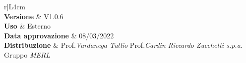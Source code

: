 \begin{center}
	\begin{tabular}{r|L{4cm}}
			 \\
			\hline
			\textbf{Versione}			& V1.0.6 \\
			\textbf{Uso}		& Esterno \\
			\textbf{Data approvazione} 			& 08/03/2022 \\
			\textbf{Distribuzione} 	&	Prof.\textit{Vardanega Tullio} \newline Prof.\textit{Cardin Riccardo} \newline \textit{Zucchetti s.p.a.} \newline Gruppo \textit{MERL} \\
	\end{tabular}
\end{center}
